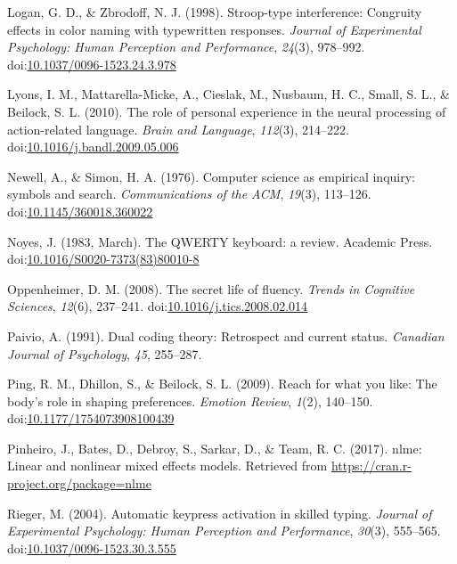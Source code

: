 \documentclass[english,man, mask]{apa6}
\theoremstyle{definition}
\theoremstyle{definition}
\theoremstyle{definition}
\theoremstyle{remark}
\begin{document}
\hypertarget{ref-Logan1998}{}
Logan, G. D., \& Zbrodoff, N. J. (1998). Stroop-type interference:
Congruity effects in color naming with typewritten responses.
\emph{Journal of Experimental Psychology: Human Perception and
Performance}, \emph{24}(3), 978--992.
doi:\href{https://doi.org/10.1037/0096-1523.24.3.978}{10.1037/0096-1523.24.3.978}

\hypertarget{ref-Lyons2010}{}
Lyons, I. M., Mattarella-Micke, A., Cieslak, M., Nusbaum, H. C., Small,
S. L., \& Beilock, S. L. (2010). The role of personal experience in the
neural processing of action-related language. \emph{Brain and Language},
\emph{112}(3), 214--222.
doi:\href{https://doi.org/10.1016/j.bandl.2009.05.006}{10.1016/j.bandl.2009.05.006}

\hypertarget{ref-Newell1976}{}
Newell, A., \& Simon, H. A. (1976). Computer science as empirical
inquiry: symbols and search. \emph{Communications of the ACM},
\emph{19}(3), 113--126.
doi:\href{https://doi.org/10.1145/360018.360022}{10.1145/360018.360022}

\hypertarget{ref-Noyes1983}{}
Noyes, J. (1983, March). The QWERTY keyboard: a review. Academic Press.
doi:\href{https://doi.org/10.1016/S0020-7373(83)80010-8}{10.1016/S0020-7373(83)80010-8}

\hypertarget{ref-Oppenheimer2008}{}
Oppenheimer, D. M. (2008). The secret life of fluency. \emph{Trends in
Cognitive Sciences}, \emph{12}(6), 237--241.
doi:\href{https://doi.org/10.1016/j.tics.2008.02.014}{10.1016/j.tics.2008.02.014}

\hypertarget{ref-Paivio1991}{}
Paivio, A. (1991). Dual coding theory: Retrospect and current status.
\emph{Canadian Journal of Psychology}, \emph{45}, 255--287.

\hypertarget{ref-Ping2009}{}
Ping, R. M., Dhillon, S., \& Beilock, S. L. (2009). Reach for what you
like: The body's role in shaping preferences. \emph{Emotion Review},
\emph{1}(2), 140--150.
doi:\href{https://doi.org/10.1177/1754073908100439}{10.1177/1754073908100439}

\hypertarget{ref-Pinheiro2017}{}
Pinheiro, J., Bates, D., Debroy, S., Sarkar, D., \& Team, R. C. (2017).
nlme: Linear and nonlinear mixed effects models. Retrieved from
\url{https://cran.r-project.org/package=nlme}

\hypertarget{ref-Rieger2004}{}
Rieger, M. (2004). Automatic keypress activation in skilled typing.
\emph{Journal of Experimental Psychology: Human Perception and
Performance}, \emph{30}(3), 555--565.
doi:\href{https://doi.org/10.1037/0096-1523.30.3.555}{10.1037/0096-1523.30.3.555}
\end{document}
